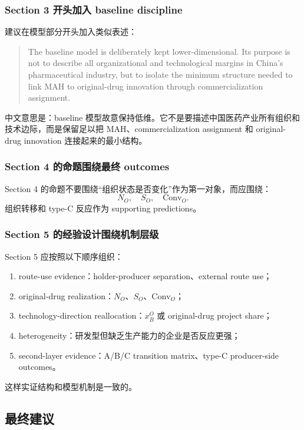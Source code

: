 \documentclass[12pt]{article}
\newcommand{\Conv}{\mathrm{Conv}}
\begin{document}
\subsubsection{Section 3 开头加入 baseline discipline}

建议在模型部分开头加入类似表述：

\begin{quote}
The baseline model is deliberately kept lower-dimensional. Its purpose is not to describe all organizational and technological margins in China's pharmaceutical industry, but to isolate the minimum structure needed to link MAH to original-drug innovation through commercialization assignment.
\end{quote}

中文意思是：baseline 模型故意保持低维。它不是要描述中国医药产业所有组织和技术边际，而是保留足以把 MAH、commercialization assignment 和 original-drug innovation 连接起来的最小结构。

\subsubsection{Section 4 的命题围绕最终 outcomes}

Section 4 的命题不要围绕“组织状态是否变化”作为第一对象，而应围绕：
\[
N_O,\quad S_O,\quad \Conv_O.
\]
组织转移和 type-C 反应作为 supporting predictions。

\subsubsection{Section 5 的经验设计围绕机制层级}

Section 5 应按照以下顺序组织：
\begin{enumerate}
    \item route-use evidence：holder-producer separation、external route use；
    \item original-drug realization：$N_O$、$S_O$、$\Conv_O$；
    \item technology-direction reallocation：$x_B^O$ 或 original-drug project share；
    \item heterogeneity：研发型但缺乏生产能力的企业是否反应更强；
    \item second-layer evidence：A/B/C transition matrix、type-C producer-side outcomes。
\end{enumerate}

这样实证结构和模型机制是一致的。

\subsection{最终建议}
\end{document}
